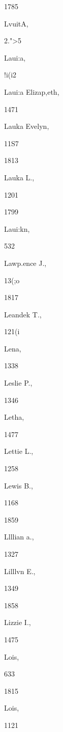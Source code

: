 {{1785 


LvuitA, 


2.">5 




Laui:a, 


!i(i2 




Laui:a Elizap,eth, 


1471 




Lauka Evelyn, 


11S7 


1813 


Lauka L., 


1201 


1799 


Laui:kn, 


532 




Lawp.ence J., 


13(;o 


1817 


Leandek T., 


121(i 




Lena, 


1338 




Leslie P., 


1346 




Letha, 


1477 




Lettie L., 


1258 




Lewis B., 


1168 


1859 


Llllian a., 


1327 




Lilllvn E., 


1349 


1858 


Lizzie I., 


1475 




Lois, 


633 


1815 


Lois, 


1121 


}}
